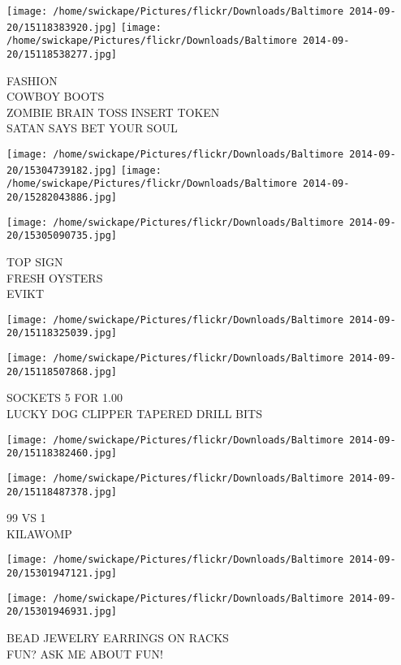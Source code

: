 \documentclass[10pt,letterpaper]{article}
\begin{document}
\texttt{[image: /home/swickape/Pictures/flickr/Downloads/Baltimore 2014-09-20/15118383920.jpg]}
\texttt{[image: /home/swickape/Pictures/flickr/Downloads/Baltimore 2014-09-20/15118538277.jpg]}

FASHION\\
COWBOY BOOTS\\
ZOMBIE BRAIN TOSS INSERT TOKEN\\
SATAN SAYS BET YOUR SOUL
\pagebreak

\texttt{[image: /home/swickape/Pictures/flickr/Downloads/Baltimore 2014-09-20/15304739182.jpg]}
\texttt{[image: /home/swickape/Pictures/flickr/Downloads/Baltimore 2014-09-20/15282043886.jpg]}

\texttt{[image: /home/swickape/Pictures/flickr/Downloads/Baltimore 2014-09-20/15305090735.jpg]}

TOP SIGN\\
FRESH OYSTERS\\
EVIKT
\pagebreak

\texttt{[image: /home/swickape/Pictures/flickr/Downloads/Baltimore 2014-09-20/15118325039.jpg]}

\vspace{0.25in}
\texttt{[image: /home/swickape/Pictures/flickr/Downloads/Baltimore 2014-09-20/15118507868.jpg]}

SOCKETS 5 FOR 1.00\\
LUCKY DOG CLIPPER TAPERED DRILL BITS
\pagebreak

\texttt{[image: /home/swickape/Pictures/flickr/Downloads/Baltimore 2014-09-20/15118382460.jpg]}

\vspace{0.25in}
\texttt{[image: /home/swickape/Pictures/flickr/Downloads/Baltimore 2014-09-20/15118487378.jpg]}

99 VS 1\\
KILAWOMP
\pagebreak

\texttt{[image: /home/swickape/Pictures/flickr/Downloads/Baltimore 2014-09-20/15301947121.jpg]}

\vspace{0.25in}
\texttt{[image: /home/swickape/Pictures/flickr/Downloads/Baltimore 2014-09-20/15301946931.jpg]}

BEAD JEWELRY EARRINGS ON RACKS\\
FUN?  ASK ME ABOUT FUN!
\pagebreak
\end{document}
